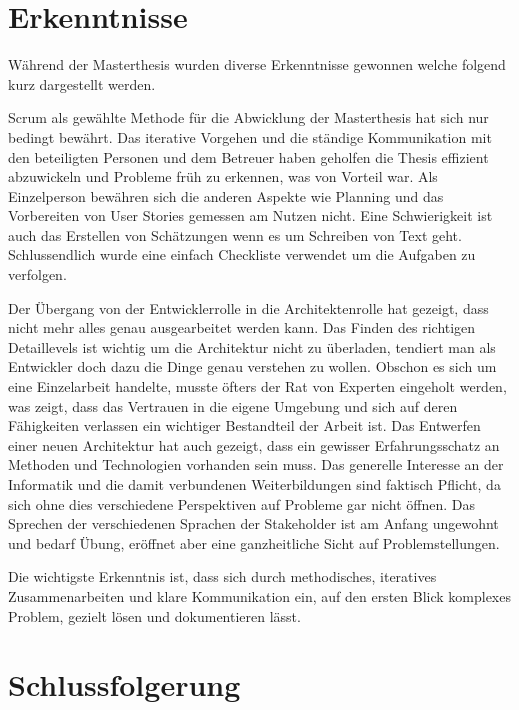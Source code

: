 \chapter{Erkenntnisse}

Während der Masterthesis wurden diverse Erkenntnisse gewonnen welche folgend kurz dargestellt werden.\newline

Scrum als gewählte Methode für die Abwicklung der Masterthesis hat sich nur bedingt bewährt. Das iterative Vorgehen und die ständige Kommunikation mit den beteiligten Personen und dem Betreuer haben geholfen die Thesis effizient abzuwickeln und Probleme früh zu erkennen, was von Vorteil war. Als Einzelperson bewähren sich die anderen Aspekte wie Planning und das Vorbereiten von User Stories gemessen am Nutzen nicht. Eine Schwierigkeit ist auch das Erstellen von Schätzungen wenn es um Schreiben von Text geht. Schlussendlich wurde eine einfach Checkliste verwendet um die Aufgaben zu verfolgen.\newline

Der Übergang von der Entwicklerrolle in die Architektenrolle hat gezeigt, dass nicht mehr alles genau ausgearbeitet werden kann. Das Finden des richtigen Detaillevels ist wichtig um die Architektur nicht zu überladen, tendiert man als Entwickler doch dazu die Dinge genau verstehen zu wollen. Obschon es sich um eine Einzelarbeit handelte, musste öfters der Rat von Experten eingeholt werden, was zeigt, dass das Vertrauen in die eigene Umgebung und sich auf deren Fähigkeiten verlassen ein wichtiger Bestandteil der Arbeit ist. Das Entwerfen einer neuen Architektur hat auch gezeigt, dass ein gewisser Erfahrungsschatz an Methoden und Technologien vorhanden sein muss. Das generelle Interesse an der Informatik und die damit verbundenen Weiterbildungen sind faktisch Pflicht, da sich ohne dies verschiedene Perspektiven auf Probleme gar nicht öffnen. Das Sprechen der verschiedenen Sprachen der Stakeholder ist am Anfang ungewohnt und bedarf Übung, eröffnet aber eine ganzheitliche Sicht auf Problemstellungen.\newline

Die wichtigste Erkenntnis ist, dass sich durch methodisches, iteratives Zusammenarbeiten und klare Kommunikation ein, auf den ersten Blick komplexes Problem, gezielt lösen und dokumentieren lässt.

\chapter{Schlussfolgerung}

